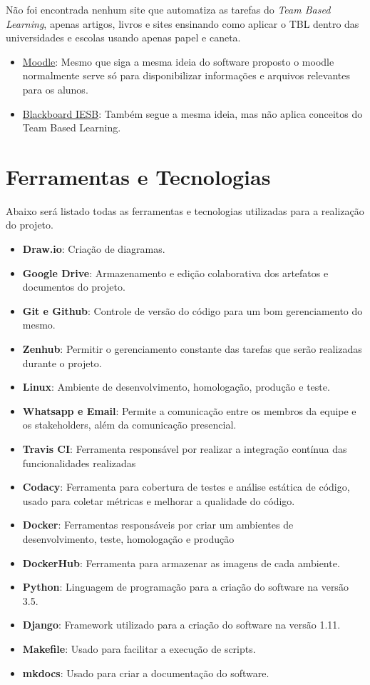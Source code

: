 Não foi encontrada nenhum site que automatiza as tarefas do \textit{Team Based Learning}, apenas artigos, livros e sites ensinando como aplicar o TBL dentro das universidades e escolas usando apenas papel e caneta.

\begin{itemize}
  \item \href{https://aprender.unb.br/}{Moodle}: Mesmo que siga a mesma ideia do software proposto o moodle normalmente serve só para disponibilizar informações e arquivos relevantes para os alunos.
  \item \href{https://iesb.blackboard.com/}{Blackboard IESB}: Também segue a mesma ideia, mas não aplica conceitos do Team Based Learning.
\end{itemize}

\section{Ferramentas e Tecnologias}

Abaixo será listado todas as ferramentas e tecnologias utilizadas para a realização do projeto.

\begin{itemize}
  \item \textbf{Draw.io}: Criação de diagramas.
  \item \textbf{Google Drive}: Armazenamento e edição colaborativa dos artefatos e documentos do projeto.
  \item \textbf{Git e Github}: Controle de versão do código para um bom gerenciamento do mesmo.
  \item \textbf{Zenhub}: Permitir o gerenciamento constante das tarefas que serão realizadas durante o projeto.
  \item \textbf{Linux}: Ambiente de desenvolvimento, homologação, produção e teste.
  \item \textbf{Whatsapp e Email}: Permite a comunicação entre os membros da equipe e os stakeholders, além da
    comunicação presencial.
  \item \textbf{Travis CI}: Ferramenta responsável por realizar a integração contínua das funcionalidades realizadas
  \item \textbf{Codacy}: Ferramenta para cobertura de testes e análise estática de código, usado para coletar métricas e
    melhorar a qualidade do código.
  \item \textbf{Docker}: Ferramentas responsáveis por criar um ambientes de desenvolvimento, teste, homologação e produção
  \item \textbf{DockerHub}: Ferramenta para armazenar as imagens de cada ambiente.
  \item \textbf{Python}: Linguagem de programação para a criação do software na versão 3.5.
  \item \textbf{Django}: Framework utilizado para a criação do software na versão 1.11.
  \item \textbf{Makefile}: Usado para facilitar a execução de scripts.
  \item \textbf{mkdocs}: Usado para criar a documentação do software.
\end{itemize}

